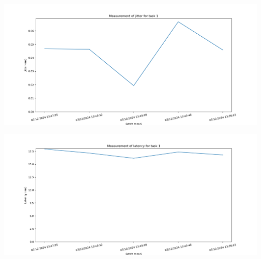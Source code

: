 \documentclass[a4paper,12pt]{scrreprt}
\begin{document}
\begin{minipage}{.5\textwidth}
    \centering
    \includegraphics[width=\textwidth]{img/analysis/jitter.png}
    \label{fig:jitter}
\end{minipage}
\hfill
\begin{minipage}{.5\textwidth}
    \centering
    \includegraphics[width=\textwidth]{img/analysis/latency.png}
    \label{fig:latency}
\end{minipage}
\end{document}
